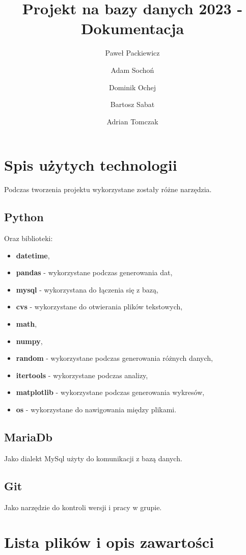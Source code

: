 \documentclass[12pt,a4paper]{article}
\begin{document}
\title{Projekt na bazy danych 2023 - Dokumentacja}
\author{Paweł Packiewicz \and Adam Sochoń \and Dominik Ochej \and Bartosz Sabat \and Adrian Tomczak}
\maketitle
\tableofcontents
\section{Spis użytych technologii}
Podczas tworzenia projektu wykorzystane zostały różne narzędzia.
\subsection{Python}
Oraz biblioteki:
\begin{itemize}
\item \textbf{datetime},
\item \textbf{pandas} - wykorzystane podczas generowania dat,
\item \textbf{mysql} - wykorzystana do łączenia się z bazą,
\item \textbf{cvs} - wykorzystane do otwierania plików tekstowych,
\item \textbf{math},
\item \textbf{numpy},
\item \textbf{random} - wykorzystane podczas generowania różnych danych,
\item \textbf{itertools} - wykorzystane podczas analizy,
\item \textbf{matplotlib} - wykorzystane podczas generowania wykresów,
\item \textbf{os} - wykorzystane do nawigowania między plikami.
\end{itemize}

\subsection{MariaDb}
Jako dialekt MySql użyty do komunikacji z bazą danych.

\subsection{Git}
Jako narzędzie do kontroli wersji i pracy w grupie.

\section{Lista plików i opis zawartości}
\end{document}

